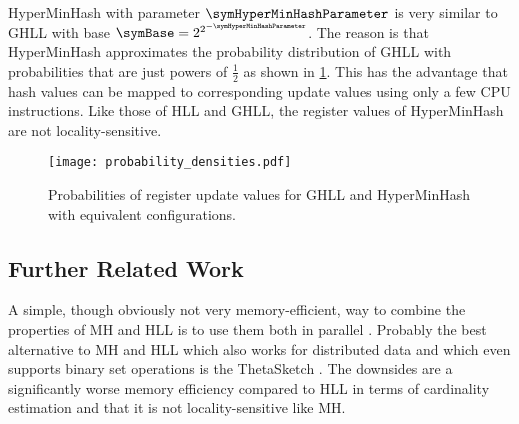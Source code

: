 \documentclass[sigconf, nonacm]{acmart}
\begin{document}
HyperMinHash with parameter $\symHyperMinHashParameter$ is very similar to \ac{GHLL} with base $\symBase=2^{2^{-\symHyperMinHashParameter}}$. The reason is that HyperMinHash approximates the probability distribution of \ac{GHLL} with probabilities that are just powers of $\frac{1}{2}$ as shown in \cref{fig:probability_densities}. This has the advantage that hash values can be mapped to corresponding update values using only a few CPU instructions. Like those of \ac{HLL} and \ac{GHLL}, the register values of HyperMinHash are not locality-sensitive.

\begin{figure}
  \centering
  \texttt{[image: probability\_densities.pdf]}
  \caption{Probabilities of register update values for \acs*{GHLL} and HyperMinHash with equivalent configurations.} \label{fig:probability_densities}
\end{figure}

\subsection{Further Related Work}
A simple, though obviously not very memory-efficient, way to combine the properties of \ac{MH} and \ac{HLL} is to use them both in parallel \cite{Pascoe2013, CastroFernandez2019}. 
Probably the best alternative to \ac{MH} and \ac{HLL} which also works for distributed data and which even supports binary set operations is the ThetaSketch \cite{Dasgupta2016}. The downsides are a significantly worse memory efficiency compared to \ac{HLL} in terms of cardinality estimation and that it is not locality-sensitive like \ac{MH}.
\end{document}
